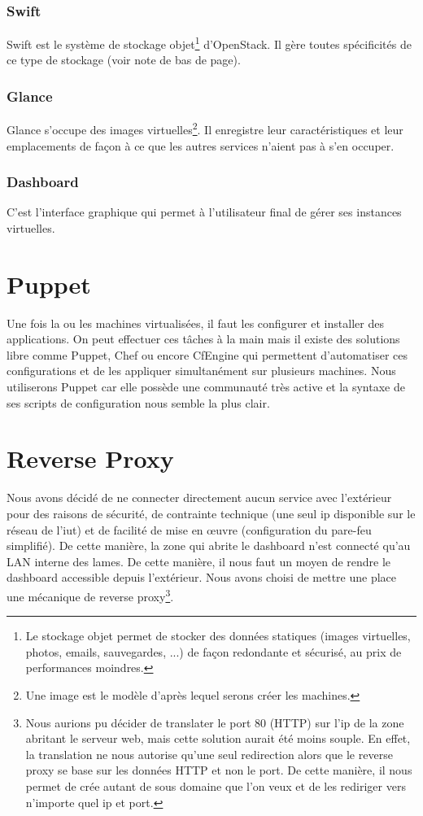 \documentclass{report}
\begin{document}
\subsubsection{Swift}
Swift est le système de stockage objet\footnote{Le stockage objet permet de stocker des données statiques (images virtuelles, photos, emails, sauvegardes, ...) de façon redondante et sécurisé, au prix de performances moindres.} d'OpenStack. Il gère toutes spécificités de ce type de stockage (voir note de bas de page).

\subsubsection{Glance}
Glance s'occupe des images virtuelles\footnote{Une image est le modèle d'après lequel serons créer les machines.}. Il enregistre leur caractéristiques et leur emplacements de façon à ce que les autres services n'aient pas à s'en occuper.

\subsubsection{Dashboard}
C'est l'interface graphique qui permet à l'utilisateur final de gérer ses instances virtuelles.

\section{Puppet}
Une fois la ou les machines virtualisées, il faut les configurer et installer des applications. On peut effectuer ces tâches à la main mais il existe des solutions libre comme Puppet, Chef ou encore CfEngine qui permettent d'automatiser ces configurations et de les appliquer simultanément sur plusieurs machines. Nous utiliserons Puppet car elle possède une communauté très active et la syntaxe de ses scripts de configuration nous semble la plus clair.

\section{Reverse Proxy}
Nous avons décidé de ne connecter directement aucun service avec l'extérieur pour des raisons de sécurité, de contrainte technique (une seul ip disponible sur le réseau de l'iut) et de facilité de mise en œuvre (configuration du pare-feu simplifié). De cette manière, la zone qui abrite le dashboard n'est connecté qu'au LAN interne des lames. De cette manière, il nous faut un moyen de rendre le dashboard accessible depuis l'extérieur. Nous avons choisi de mettre une place une mécanique de reverse proxy\footnote{Nous aurions pu décider de translater le port 80 (HTTP) sur l'ip de la zone abritant le serveur web, mais cette solution aurait été moins souple. En effet, la translation ne nous autorise qu'une seul redirection alors que le reverse proxy se base sur les données HTTP et non le port. De cette manière, il nous permet de crée autant de sous domaine que l'on veux et de les rediriger vers n'importe quel ip et port.}.
\end{document}
